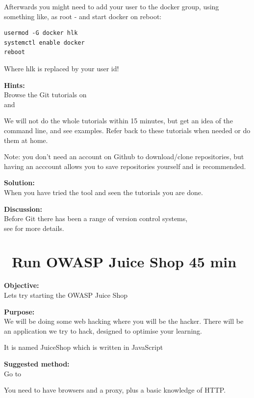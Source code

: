 \documentclass[a4paper,11pt,notitlepage]{report}
\begin{document}
Afterwards you might need to add your user to the docker group, using something like, as root - and start docker on reboot:
\begin{verbatim}
usermod -G docker hlk
systemctl enable docker
reboot
\end{verbatim}

Where hlk is replaced by your user id!


{\bf Hints:}\\
Browse the Git tutorials on \\
and 

We will not do the whole tutorials within 15 minutes, but get an idea of the command line, and see examples. Refer back to these tutorials when needed or do them at home.

Note: you don't need an account on Github to download/clone repositories, but having an acccount allows you to save repositories yourself and is recommended.

{\bf Solution:}\\
When you have tried the tool and seen the tutorials you are done.

{\bf Discussion:}\\
Before Git there has been a range of version control systems,\\
see  for more details.


\chapter{\faInfoCircle\ Run OWASP Juice Shop 45 min}
\label{ex:sw-startjuice}


{\bf Objective:}\\
Lets try starting the OWASP Juice Shop

{\bf Purpose:}\\
We will be doing some web hacking where you will be the hacker. There
will be an application we try to hack, designed to
optimise your learning.

It is named JuiceShop which is written in JavaScript

{\bf Suggested method:}\\
Go to 

You need to have browsers and a proxy, plus a basic knowledge of HTTP.
\end{document}
